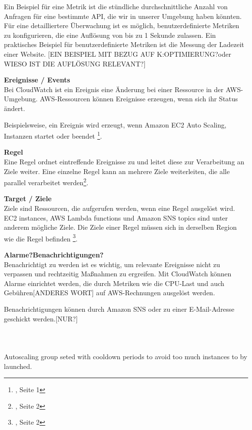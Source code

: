 Ein Beispiel für eine Metrik ist die stündliche durchschnittliche Anzahl von Anfragen für eine bestimmte API, die wir in unserer Umgebung haben könnten.
Für eine detailliertere Überwachung ist es möglich, benutzerdefinierte Metriken zu konfigurieren, die eine Auflösung von bis zu 1 Sekunde zulassen. Ein praktisches Beispiel für benutzerdefinierte Metriken ist die Messung der Ladezeit einer Website.
[EIN BEISPIEL MIT BEZUG AUF K:OPTIMIERUNG?oder WIESO IST DIE AUFLÖSUNG RELEVANT?]

\textbf{Ereignisse / Events} \\
Bei CloudWatch ist ein Ereignis eine Änderung bei einer Ressource in der AWS-Umgebung. 
AWS-Ressourcen können Ereignisse erzeugen, wenn sich ihr Status ändert. 

Beispielsweise, ein Ereignis wird erzeugt, wenn Amazon EC2 Auto Scaling, Instanzen startet oder beendet \footnote{\cite{AMZ13}, Seite 1}. 

\textbf{Regel} \\
Eine Regel ordnet eintreffende Ereignisse zu und leitet diese zur Verarbeitung an Ziele weiter.
Eine einzelne Regel kann an mehrere Ziele weiterleiten, die alle parallel verarbeitet werden\footnote{\cite{AMZ13}, Seite 2}.

\textbf{Target / Ziele} \\
Ziele sind Ressourcen, die aufgerufen werden, wenn eine Regel ausgelöst wird.
EC2 instances, AWS Lambda functions und Amazon SNS topics sind unter anderem mögliche Ziele.
Die Ziele einer Regel müssen sich in derselben Region wie die Regel befinden
\footnote{\cite{AMZ13}, Seite 2}.

\textbf{Alarme?Benachrichtigungen?}\\
Benachrichtigt zu werden ist es wichtig, um relevante Ereignisse nicht zu verpassen und rechtzeitig Maßnahmen zu ergreifen. Mit CloudWatch können Alarme einrichtet werden, die durch Metriken wie die CPU-Last und auch Gebühren[ANDERES WORT] auf AWS-Rechnungen ausgelöst werden.

Benachrichtigungen können durch Amazon SNS oder zu einer E-Mail-Adresse geschickt werden.[NUR?]
\\\\
\\\\
Autoscaling group seted with cooldown periods to avoid too much instances to by launched.


